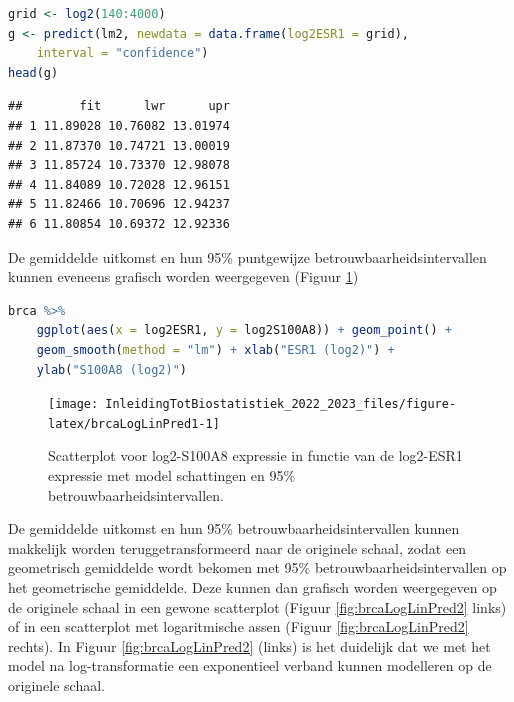 \documentclass[
  12pt,dutch,coursenotes]{book}
\begin{document}
\begin{lstlisting}[language=R]
grid <- log2(140:4000)
g <- predict(lm2, newdata = data.frame(log2ESR1 = grid),
    interval = "confidence")
head(g)
\end{lstlisting}

\begin{lstlisting}
##        fit      lwr      upr
## 1 11.89028 10.76082 13.01974
## 2 11.87370 10.74721 13.00019
## 3 11.85724 10.73370 12.98078
## 4 11.84089 10.72028 12.96151
## 5 11.82466 10.70696 12.94237
## 6 11.80854 10.69372 12.92336
\end{lstlisting}

De gemiddelde uitkomst en hun 95\% puntgewijze betrouwbaarheidsintervallen kunnen eveneens grafisch worden weergegeven (Figuur \ref{fig:brcaLogLinPred1})

\begin{lstlisting}[language=R]
brca %>%
    ggplot(aes(x = log2ESR1, y = log2S100A8)) + geom_point() +
    geom_smooth(method = "lm") + xlab("ESR1 (log2)") +
    ylab("S100A8 (log2)")
\end{lstlisting}

\begin{figure}

{\centering \texttt{[image: InleidingTotBiostatistiek\_2022\_2023\_files/figure-latex/brcaLogLinPred1-1]} 

}

\caption{Scatterplot voor log2-S100A8 expressie in functie van de log2-ESR1 expressie met model schattingen en 95$\%$ betrouwbaarheidsintervallen.}\label{fig:brcaLogLinPred1}
\end{figure}

De gemiddelde uitkomst en hun 95\% betrouwbaarheidsintervallen kunnen makkelijk worden teruggetransformeerd naar de originele schaal, zodat een geometrisch gemiddelde wordt bekomen met 95\% betrouwbaarheidsintervallen op het geometrische gemiddelde.
Deze kunnen dan grafisch worden weergegeven op de originele schaal in een gewone scatterplot (Figuur \ref{fig:brcaLogLinPred2} links) of in een scatterplot met logaritmische assen (Figuur \ref{fig:brcaLogLinPred2} rechts).
In Figuur \ref{fig:brcaLogLinPred2} (links) is het duidelijk dat we met het model na log-transformatie een exponentieel verband kunnen modelleren op de originele schaal.
\end{document}
